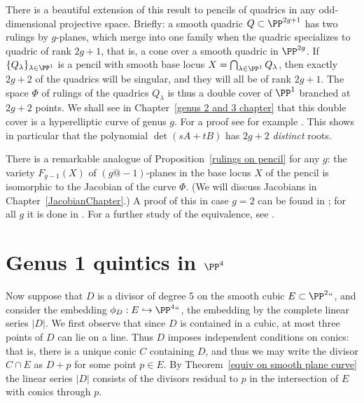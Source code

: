 \begin{fact}
There is a beautiful extension of this result to pencils of quadrics
in any odd-dimensional projective space. Briefly: a smooth quadric $Q
\subset \PP^{2g+1}$ has two rulings by $g$-planes, which merge into
one family when the quadric specializes to quadric of rank $2g+1$,
that is, a cone over a smooth quadric in $\PP^{2g}$. If
$\{Q_\lambda\}_{\lambda \in \PP^1}$ is a pencil with smooth base locus
$X = \bigcap_{\lambda \in \PP^1} Q_\lambda$, then exactly $2g+2$ of
the quadrics will be singular, and they will all be of rank $2g+1$.
The space $\Phi$ of rulings of the quadrics $Q_\lambda$ is thus a
double cover of $\PP^1$ branched at $2g+2$  points. We shall see in
Chapter~\ref{genus 2 and 3 chapter} that this
%
double cover
is a
%
hyperelliptic curve of genus $g$. For a proof see for
example \cite[Proposition 22.34]{Harris1995}.
 This shows in particular that the polynomial $\det(sA+tB)$ has $2g+2$ \emph{distinct} roots.

There is
a remarkable analogue of Proposition~\ref{rulings on pencil}
for any $g$: the variety $F_{g-1}(X)$ of $(g@{-}1)$-planes in
the base locus $X$ of the pencil is isomorphic to the
%
Jacobian
of the  curve $\Phi$. (We will discuss Jacobians in Chapter~\ref{JacobianChapter}.) A proof of this in case $g=2$ can be found in \cite{Griffiths-Harris1978}; for all $g$ it is done in \cite{Donagi}. For a further study of the equivalence, see \cite{Eisenbud-Schreyer}.
\end{fact}

\section{Genus 1 quintics in $\PP^4$}
\label{g=1 in P4}\label{Genus 1 quintics in P4}

Now suppose that $D$ is a
divisor of degree 5
on the smooth cubic $E\subset \PP^2` `$, and consider the embedding
%
%
$\phi_D : E \hookrightarrow  \PP^4` `$, the embedding by the complete linear series $|D|$. We first observe that since $D$ is
contained in a cubic, at most three points of $D$ can lie on a line.
Thus $D$ imposes independent conditions on conics: that is, there is a
unique conic $C$ containing $D$,
and thus we may write the divisor $C\cap E$ as $D+p$ for some point $p\in E$. By Theorem~\ref{equiv on smooth plane curve}
the linear series $|D|$ consists of the divisors
residual
%
to $p$ in the intersection of $E$ with conics through $p$.

